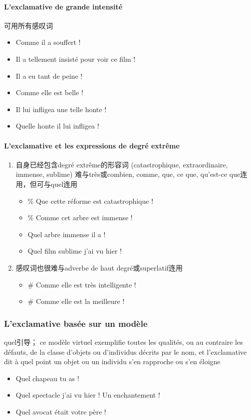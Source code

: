 \documentclass[UTF8]{report}
\begin{document}
\paragraph{L’exclamative de grande intensité}
可用所有感叹词

\begin{itemize}
    \item Comme il a souffert !
    \item Il a tellement insisté pour voir ce film !
    \item Il a eu tant de peine !
    \item Comme elle est belle !
    \item Il lui infligea une telle honte !
    \item Quelle honte il lui infligea !
\end{itemize}


\paragraph{L’exclamative et les expressions de degré extrême}
\begin{enumerate}
    \item 自身已经包含degré extrême的形容词 (catastrophique, extraordinaire, immense, sublime) 难与très或combien, comme, que, ce que, qu’est-ce que连用，但可与quel连用
    \begin{itemize}
        \item \% Que cette réforme est catastrophique !
        \item \% Comme cet arbre est immense !
        \item Quel arbre immense il a !
        \item Quel film sublime j’ai vu hier !
    \end{itemize}
    \item 感叹词也很难与adverbe de haut degré或superlatif连用
    \begin{itemize}
        \item \# Comme elle est très intelligente !
        \item \# Comme elle est la meilleure !
    \end{itemize}
\end{enumerate}


\subsubsection{L’exclamative basée sur un modèle}
quel引导； ce modèle virtuel exemplifie toutes les qualités, ou au contraire les défauts, de la classe d’objets ou d’individus décrits par le nom, et l’exclamative dit à quel point un objet ou un individu s’en rapproche ou s’en éloigne
\begin{itemize}
    \item Quel chapeau tu as !
    \item Quel spectacle j’ai vu hier ! Un enchantement !
    \item Quel avocat était votre père ! 
\end{itemize}
\end{document}
